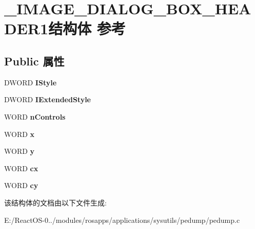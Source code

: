 \hypertarget{struct___i_m_a_g_e___d_i_a_l_o_g___b_o_x___h_e_a_d_e_r1}{}\section{\+\_\+\+I\+M\+A\+G\+E\+\_\+\+D\+I\+A\+L\+O\+G\+\_\+\+B\+O\+X\+\_\+\+H\+E\+A\+D\+E\+R1结构体 参考}
\label{struct___i_m_a_g_e___d_i_a_l_o_g___b_o_x___h_e_a_d_e_r1}
\subsection*{Public 属性}
\begin{DoxyCompactItemize}
\item 
\mbox{\label{struct___i_m_a_g_e___d_i_a_l_o_g___b_o_x___h_e_a_d_e_r1_ad530e1a4c825ba45e9c2ef4da9a5a9b2}} 
D\+W\+O\+RD {\bfseries I\+Style}
\item 
\mbox{\label{struct___i_m_a_g_e___d_i_a_l_o_g___b_o_x___h_e_a_d_e_r1_a73422ef1abacde5a66b42cccce7b422a}} 
D\+W\+O\+RD {\bfseries I\+Extended\+Style}
\item 
\mbox{\label{struct___i_m_a_g_e___d_i_a_l_o_g___b_o_x___h_e_a_d_e_r1_aae6507fbe241e900873342c7d866d443}} 
W\+O\+RD {\bfseries n\+Controls}
\item 
\mbox{\label{struct___i_m_a_g_e___d_i_a_l_o_g___b_o_x___h_e_a_d_e_r1_a87e5fc0f52a3f6eccc05d2b5e237a7c9}} 
W\+O\+RD {\bfseries x}
\item 
\mbox{\label{struct___i_m_a_g_e___d_i_a_l_o_g___b_o_x___h_e_a_d_e_r1_ac976a3fc599bb9dbc11cc2994543b546}} 
W\+O\+RD {\bfseries y}
\item 
\mbox{\label{struct___i_m_a_g_e___d_i_a_l_o_g___b_o_x___h_e_a_d_e_r1_afabc40d70033d88cfe87a615c95c22d9}} 
W\+O\+RD {\bfseries cx}
\item 
\mbox{\label{struct___i_m_a_g_e___d_i_a_l_o_g___b_o_x___h_e_a_d_e_r1_ab05544c0358599a4ef1f34db680bdc0b}} 
W\+O\+RD {\bfseries cy}
\end{DoxyCompactItemize}


该结构体的文档由以下文件生成\+:\begin{DoxyCompactItemize}
\item 
E\+:/\+React\+O\+S-\/0../modules/rosapps/applications/sysutils/pedump/pedump.\+c\end{DoxyCompactItemize}
